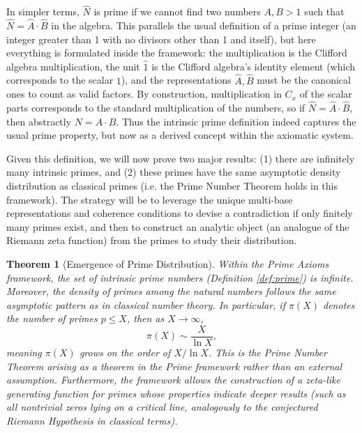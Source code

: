 \documentclass[11pt]{article}
\newtheorem{theorem}{Theorem}[section]
\begin{document}
In simpler terms, $\hat{N}$ is prime if we cannot find two numbers $A, B > 1$ such that $\hat{N} = \hat{A}\cdot\hat{B}$ in the algebra. This parallels the usual definition of a prime integer (an integer greater than 1 with no divisors other than 1 and itself), but here everything is formulated inside the framework: the multiplication is the Clifford algebra multiplication, the unit $\hat{1}$ is the Clifford algebra’s identity element (which corresponds to the scalar $1$), and the representations $\hat{A}, \hat{B}$ must be the canonical ones to count as valid factors. By construction, multiplication in $C_x$ of the scalar parts corresponds to the standard multiplication of the numbers, so if $\hat{N} = \hat{A}\cdot\hat{B}$, then abstractly $N = A \cdot B$. Thus the intrinsic prime definition indeed captures the usual prime property, but now as a derived concept within the axiomatic system.

Given this definition, we will now prove two major results: (1) there are infinitely many intrinsic primes, and (2) these primes have the same asymptotic density distribution as classical primes (i.e. the Prime Number Theorem holds in this framework). The strategy will be to leverage the unique multi-base representations and coherence conditions to devise a contradiction if only finitely many primes exist, and then to construct an analytic object (an analogue of the Riemann zeta function) from the primes to study their distribution.

\begin{theorem}[Emergence of Prime Distribution]\label{thm:prime-distribution}
Within the Prime Axioms framework, the set of intrinsic prime numbers (Definition \ref{def:prime}) is infinite. Moreover, the density of primes among the natural numbers follows the same asymptotic pattern as in classical number theory. In particular, if $\pi(X)$ denotes the number of primes $p \le X$, then as $X \to \infty$,
\[ \pi(X) \sim \frac{X}{\ln X}, \] 
meaning $\pi(X)$ grows on the order of $X/\ln X$. This is the Prime Number Theorem arising as a \emph{theorem} in the Prime framework rather than an external assumption. Furthermore, the framework allows the construction of a zeta-like generating function for primes whose properties indicate deeper results (such as all nontrivial zeros lying on a critical line, analogously to the conjectured Riemann Hypothesis in classical terms).
\end{theorem}
\end{document}
